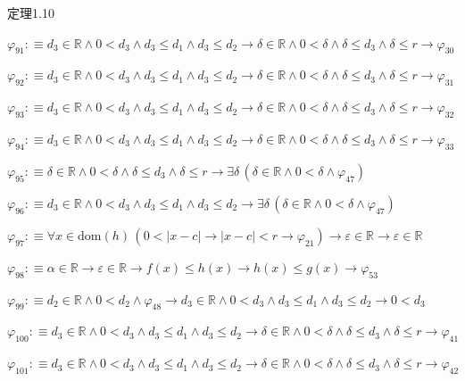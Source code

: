 \begin{fullproof}{定理1.10}
\begin{abbrevlist}
\item $\varphi_{91} :\equiv d_{3} \in \mathbb{R} \land 0 < d_{3} \land d_{3} \leq d_{1} \land d_{3} \leq d_{2} \to \delta \in \mathbb{R} \land 0 < \delta \land \delta \leq d_{3} \land \delta \leq r \to \varphi_{30}$
\item $\varphi_{92} :\equiv d_{3} \in \mathbb{R} \land 0 < d_{3} \land d_{3} \leq d_{1} \land d_{3} \leq d_{2} \to \delta \in \mathbb{R} \land 0 < \delta \land \delta \leq d_{3} \land \delta \leq r \to \varphi_{31}$
\item $\varphi_{93} :\equiv d_{3} \in \mathbb{R} \land 0 < d_{3} \land d_{3} \leq d_{1} \land d_{3} \leq d_{2} \to \delta \in \mathbb{R} \land 0 < \delta \land \delta \leq d_{3} \land \delta \leq r \to \varphi_{32}$
\item $\varphi_{94} :\equiv d_{3} \in \mathbb{R} \land 0 < d_{3} \land d_{3} \leq d_{1} \land d_{3} \leq d_{2} \to \delta \in \mathbb{R} \land 0 < \delta \land \delta \leq d_{3} \land \delta \leq r \to \varphi_{33}$
\item $\varphi_{95} :\equiv \delta \in \mathbb{R} \land 0 < \delta \land \delta \leq d_{3} \land \delta \leq r \to \exists \delta\,(\delta \in \mathbb{R} \land 0 < \delta \land \varphi_{47})$
\item $\varphi_{96} :\equiv d_{3} \in \mathbb{R} \land 0 < d_{3} \land d_{3} \leq d_{1} \land d_{3} \leq d_{2} \to \exists \delta\,(\delta \in \mathbb{R} \land 0 < \delta \land \varphi_{47})$
\item $\varphi_{97} :\equiv \forall x \in \mathrm{dom}(h)\,(0 < \lvert x - c \rvert \to \lvert x - c \rvert < r \to \varphi_{21}) \to \varepsilon \in \mathbb{R} \to \varepsilon \in \mathbb{R}$
\item $\varphi_{98} :\equiv \alpha \in \mathbb{R} \to \varepsilon \in \mathbb{R} \to f(x) \leq h(x) \to h(x) \leq g(x) \to \varphi_{53}$
\item $\varphi_{99} :\equiv d_{2} \in \mathbb{R} \land 0 < d_{2} \land \varphi_{48} \to d_{3} \in \mathbb{R} \land 0 < d_{3} \land d_{3} \leq d_{1} \land d_{3} \leq d_{2} \to 0 < d_{3}$
\item $\varphi_{100} :\equiv d_{3} \in \mathbb{R} \land 0 < d_{3} \land d_{3} \leq d_{1} \land d_{3} \leq d_{2} \to \delta \in \mathbb{R} \land 0 < \delta \land \delta \leq d_{3} \land \delta \leq r \to \varphi_{41}$
\item $\varphi_{101} :\equiv d_{3} \in \mathbb{R} \land 0 < d_{3} \land d_{3} \leq d_{1} \land d_{3} \leq d_{2} \to \delta \in \mathbb{R} \land 0 < \delta \land \delta \leq d_{3} \land \delta \leq r \to \varphi_{42}$

\end{abbrevlist}
\end{fullproof}
